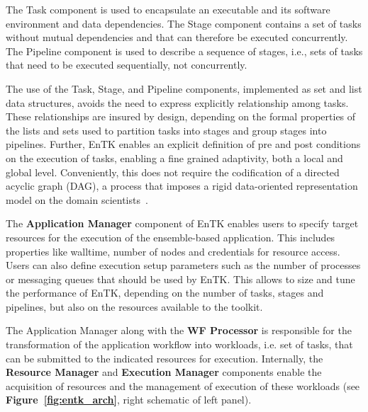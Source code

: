 The Task component is used to encapsulate an executable and 
its software environment and %
data dependencies. The Stage component contains a set of tasks without mutual
dependencies and that can therefore be executed concurrently. The Pipeline
component is used to describe a sequence of stages, i.e., %
sets of 
tasks that need to be executed sequentially, not concurrently.


The use of the Task, Stage, and Pipeline components, 
implemented as set and list data structures, avoids the need to express
explicitly relationship among tasks. These relationships are insured by
design, depending on the formal properties of the lists and sets used to
partition tasks into stages and group stages into pipelines.
Further, EnTK enables an explicit definition of pre and post conditions on
the execution of tasks, enabling a fine grained adaptivity, both a local and
global level. Conveniently, this does not require the codification of a
directed acyclic graph (DAG), a process that imposes a
rigid data-oriented    representation model on the domain
scientists~\cite{balasubramanian2017powerofmany}.

The \textbf{Application Manager} component of EnTK enables users to specify
target resources for the execution of the ensemble-based application. This
includes properties like walltime, number of nodes and credentials for
resource access. Users can also define execution setup parameters such as the
number of processes or messaging queues that should be used by EnTK\@. This
allows to size and tune the performance of EnTK, depending on the number of
tasks, stages and pipelines, but also on the resources available to the
toolkit.

The Application Manager along with the \textbf{WF Processor} is responsible
for the transformation of the application workflow into workloads, i.e. set of 
tasks, that can be submitted to the indicated resources for execution. 
Internally, the \textbf{Resource Manager} and \textbf{Execution Manager} 
components enable the acquisition of resources and the management of execution 
of these workloads (see \textbf{Figure~\ref{fig:entk_arch}}, right schematic of 
left panel).

